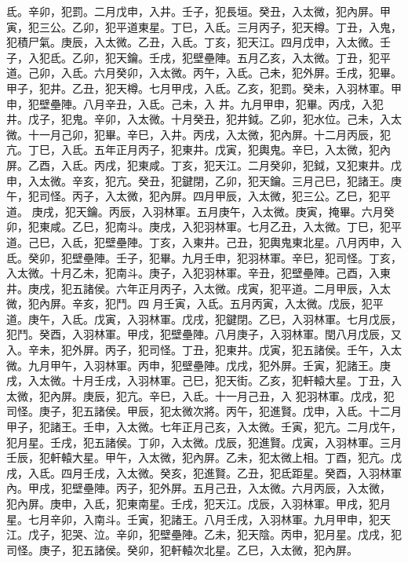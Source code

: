 \begin{pinyinscope}
 氐。辛卯，犯罰。二月戊申，入井。壬子，犯長垣。癸丑，入太微，犯內屏。甲寅，犯三公。乙卯，犯平道東星。丁巳，入氐。三月丙子，犯天樽。丁丑，入鬼，犯積尸氣。庚辰，入太微。乙丑，入氐。丁亥，犯天江。四月戊申，入太微。壬子，入犯氐。乙卯，犯天鑰。壬戌，犯壁壘陣。五月乙亥，入太微。丁丑，犯平道。己卯，入氐。六月癸卯，入太微。丙午，入氐。己未，犯外屏。壬戌，犯畢。甲子，犯井。乙丑，犯天樽。七月甲戌，入氐。乙亥，犯罰。癸未，入羽林軍。甲申，犯壁壘陣。八月辛丑，入氐。己未，入
 井。九月甲申，犯畢。丙戌，入犯井。戊子，犯鬼。辛卯，入太微。十月癸丑，犯井鉞。乙卯，犯水位。己未，入太微。十一月己卯，犯畢。辛巳，入井。丙戌，入太微，犯內屏。十二月丙辰，犯亢。丁巳，入氐。五年正月丙子，犯東井。戊寅，犯輿鬼。辛巳，入太微，犯內屏。乙酉，入氐。丙戌，犯東咸。丁亥，犯天江。二月癸卯，犯鉞，又犯東井。戊申，入太微。辛亥，犯亢。癸丑，犯鍵閉，乙卯，犯天鑰。三月己巳，犯諸王。庚午，犯司怪。丙子，入太微，犯內屏。四月甲辰，入太微，犯三公。乙巳，犯平道。
 庚戌，犯天鑰。丙辰，入羽林軍。五月庚午，入太微。庚寅，掩畢。六月癸卯，犯東咸。乙巳，犯南斗。庚戌，入犯羽林軍。七月乙丑，入太微。丁巳，犯平道。己巳，入氐，犯壁壘陣。丁亥，入東井。己丑，犯輿鬼東北星。八月丙申，入氐。癸卯，犯壁壘陣。壬子，犯畢。九月壬申，犯羽林軍。辛巳，犯司怪。丁亥，入太微。十月乙未，犯南斗。庚子，入犯羽林軍。辛丑，犯壁壘陣。己酉，入東井。庚戌，犯五諸侯。六年正月丙子，入太微。戌寅，犯平道。二月甲辰，入太微，犯內屏。辛亥，犯鬥。四
 月壬寅，入氐。五月丙寅，入太微。戊辰，犯平道。庚午，入氐。戊寅，入羽林軍。戊戌，犯鍵閉。乙巳，入羽林軍。七月戊辰，犯鬥。癸酉，入羽林軍。甲戌，犯壁壘陣。八月庚子，入羽林軍。閏八月戊辰，又入。辛未，犯外屏。丙子，犯司怪。丁丑，犯東井。戊寅，犯五諸侯。壬午，入太微。九月甲午，入羽林軍。丙申，犯壁壘陣。戊戌，犯外屏。壬寅，犯諸王。庚戌，入太微。十月壬戌，入羽林軍。己巳，犯天街。乙亥，犯軒轅大星。丁丑，入太微，犯內屏。庚辰，犯亢。辛巳，入氐。十一月己丑，入
 犯羽林軍。戊戌，犯司怪。庚子，犯五諸侯。甲辰，犯太微次將。丙午，犯進賢。戊申，入氐。十二月甲子，犯諸王。壬申，入太微。七年正月己亥，入太微。壬寅，犯亢。二月戊午，犯月星。壬戌，犯五諸侯。丁卯，入太微。戊辰，犯進賢。戊寅，入羽林軍。三月壬辰，犯軒轅大星。甲午，入太微，犯內屏。乙未，犯太微上相。丁酉，犯亢。戊戌，入氐。四月壬戌，入太微。癸亥，犯進賢。乙丑，犯氐距星。癸酉，入羽林軍內。甲戌，犯壁壘陣。丙子，犯外屏。五月己丑，入太微。六月丙辰，入太微，
 犯內屏。庚申，入氐，犯東南星。壬戌，犯天江。戊辰，入羽林軍。甲戌，犯月星。七月辛卯，入南斗。壬寅，犯諸王。八月壬戌，入羽林軍。九月甲申，犯天江。戊子，犯哭、泣。辛卯，犯壁壘陣。乙未，犯天陰。丙申，犯月星。戊戌，犯司怪。庚子，犯五諸侯。癸卯，犯軒轅次北星。乙巳，入太微，犯內屏。




\end{pinyinscope}
